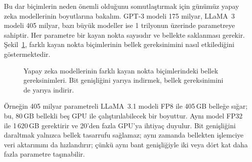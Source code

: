Bu dar biçimlerin neden önemli olduğunu somutlaştırmak için günümüz yapay zeka modellerinin boyutlarına bakalım. GPT-3 modeli 175 milyar, LLaMA~3 modeli 405 milyar, bazı büyük modeller ise 1 trilyonun üzerinde parametreye sahiptir. Her parametre bir kayan nokta sayısıdır ve bellekte saklanması gerekir. Şekil~\ref{fig:model-bellek}, farklı kayan nokta biçimlerinin bellek gereksinimini nasıl etkilediğini göstermektedir.

\begin{figure}[htbp]
\centering
{}
\caption[Yapay zeka modellerinin kayan nokta biçimine göre bellek gereksinimleri]{Yapay zeka modellerinin farklı kayan nokta biçimlerindeki bellek gereksinimleri. Bit genişliğini yarıya indirmek, bellek gereksinimini de yarıya indirir.}
\label{fig:model-bellek}
\end{figure}

Örneğin 405 milyar parametreli LLaMA~3.1 modeli FP8 ile 405\,GB belleğe sığar; bu, 80\,GB bellekli beş GPU ile çalıştırılabilecek bir boyuttur. Aynı model FP32 ile 1\,620\,GB gerektirir ve 20'den fazla GPU'ya ihtiyaç duyulur. Bit genişliğini daraltmak yalnızca bellek tasarrufu sağlamaz; aynı zamanda bellekten işlemciye veri aktarımını da hızlandırır; çünkü aynı bant genişliğiyle iki veya dört kat daha fazla parametre taşınabilir.

